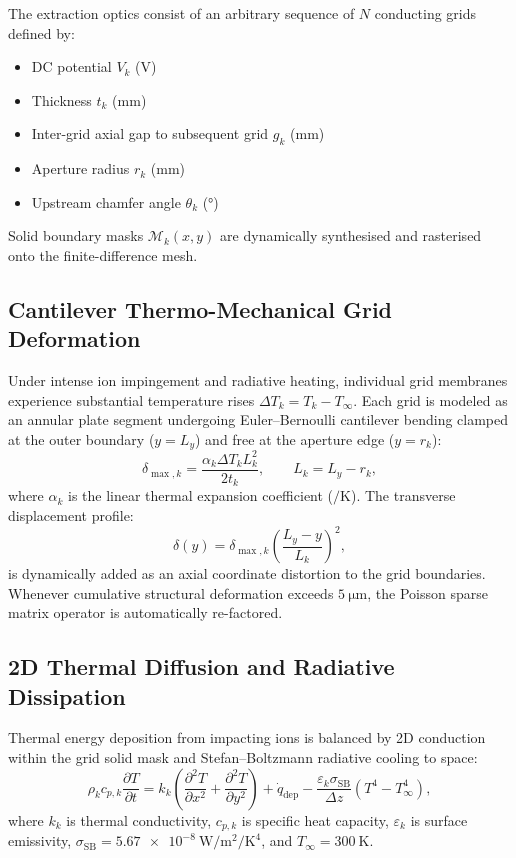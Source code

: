 \documentclass[11pt,a4paper]{article}
\begin{document}
The extraction optics consist of an arbitrary sequence of $N$ conducting grids defined by:
\begin{itemize}[nosep]
    \item DC potential $V_k$ (\si{\volt})
    \item Thickness $t_k$ (\si{\milli\meter})
    \item Inter-grid axial gap to subsequent grid $g_k$ (\si{\milli\meter})
    \item Aperture radius $r_k$ (\si{\milli\meter})
    \item Upstream chamfer angle $\theta_k$ (\si{\degree})
\end{itemize}

Solid boundary masks $\mathcal{M}_k(x,y)$ are dynamically synthesised and rasterised onto the finite-difference mesh.

\subsection{Cantilever Thermo-Mechanical Grid Deformation}

Under intense ion impingement and radiative heating, individual grid membranes experience substantial temperature rises $\Delta T_k = T_k - T_{\infty}$. Each grid is modeled as an annular plate segment undergoing Euler--Bernoulli cantilever bending clamped at the outer boundary ($y = L_y$) and free at the aperture edge ($y = r_k$):
\begin{equation}
    \delta_{\max,k} = \frac{\alpha_k \Delta T_k L_k^2}{2 t_k}, \qquad L_k = L_y - r_k,
\end{equation}
where $\alpha_k$ is the linear thermal expansion coefficient ($\si{\per\kelvin}$). The transverse displacement profile:
\begin{equation}
    \delta(y) = \delta_{\max,k} \left(\frac{L_y - y}{L_k}\right)^2,
\end{equation}
is dynamically added as an axial coordinate distortion to the grid boundaries. Whenever cumulative structural deformation exceeds $\SI{5}{\micro\meter}$, the Poisson sparse matrix operator is automatically re-factored.

\subsection{2D Thermal Diffusion and Radiative Dissipation}

Thermal energy deposition from impacting ions is balanced by 2D conduction within the grid solid mask and Stefan--Boltzmann radiative cooling to space:
\begin{equation}
    \rho_k c_{p,k} \frac{\partial T}{\partial t} = k_k \left(\frac{\partial^2 T}{\partial x^2} + \frac{\partial^2 T}{\partial y^2}\right) + \dot{q}_{\mathrm{dep}} - \frac{\varepsilon_k \sigma_{\mathrm{SB}}}{\Delta z}\left(T^4 - T_{\infty}^4\right),
\end{equation}
where $k_k$ is thermal conductivity, $c_{p,k}$ is specific heat capacity, $\varepsilon_k$ is surface emissivity, $\sigma_{\mathrm{SB}} = \SI{5.67e-8}{\watt\per\meter\squared\per\kelvin\tothe{4}}$, and $T_{\infty} = \SI{300}{\kelvin}$.
\end{document}
